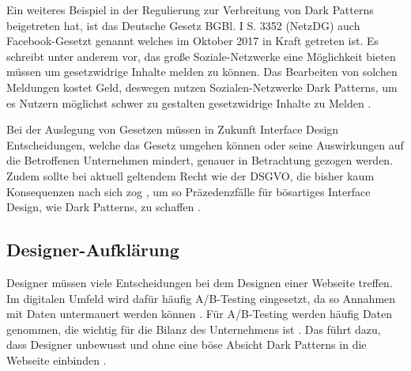\documentclass[conference,compsoc,final,a4paper]{IEEEtran}
\begin{document}
Ein weiteres Beispiel in der Regulierung zur Verbreitung von Dark Patterns beigetreten hat, ist das Deutsche Gesetz BGBl. I S. 3352 (\acs{NetzDG}) auch Facebook-Gesetzt genannt welches im Oktober 2017 in Kraft getreten ist. Es schreibt unter anderem vor, das große Soziale-Netzwerke eine Möglichkeit bieten müssen um gesetzwidrige Inhalte melden zu können. Das Bearbeiten von solchen Meldungen kostet Geld, deswegen nutzen Sozialen-Netzwerke Dark Patterns, um es Nutzern möglichst schwer zu gestalten gesetzwidrige Inhalte zu Melden \autocite{Rieger2020}.


Bei der Auslegung von Gesetzen müssen in Zukunft Interface Design Entscheidungen, welche das Gesetz umgehen können oder seine Auswirkungen auf die Betroffenen Unternehmen mindert, genauer in Betrachtung gezogen werden. Zudem sollte bei aktuell geltendem Recht wie der \acs{DSGVO}, die bisher kaum Konsequenzen nach sich zog \autocite{Nouwens2020}, um so Präzedenzfälle für bösartiges Interface Design, wie Dark Patterns, zu schaffen \autocite{Rieger2020}.

\subsection{Designer-Aufklärung}
Designer müssen viele Entscheidungen bei dem Designen einer Webseite treffen. Im digitalen Umfeld wird dafür häufig A/B-Testing eingesetzt, da so Annahmen mit Daten untermauert werden können \autocite{Kohavi2017}. Für A/B-Testing werden häufig Daten genommen, die wichtig für die Bilanz des Unternehmens ist \autocites{Kohavi2017}{Narayanan2020}. Das führt dazu, dass Designer unbewusst und ohne eine böse Absicht Dark Patterns in die Webseite einbinden \autocite{Narayanan2020}.

\end{document}
